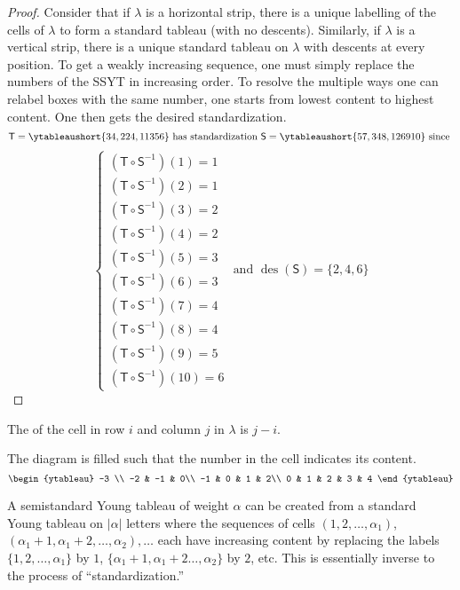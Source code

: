 \documentclass[11pt,leqno,oneside]{amsart}
\numberwithin{thm}{section}
\newcommand{\T}{\mathsf{T}} %
\renewcommand{\S}{\mathsf{S}}
\newcommand{\des}{\operatorname{des}}
\begin{document}
\begin{proof}
  Consider that if \(\lambda\) is a horizontal strip, there is a
  unique labelling of the cells of \(\lambda\) to form a standard
  tableau (with no descents). Similarly, if \(\lambda\) is a vertical
  strip, there is a unique standard tableau on \(\lambda\) with
  descents at every position. To get a weakly increasing sequence, one
  must simply replace the numbers of the SSYT in increasing order. To
  resolve the multiple ways one can relabel boxes with the same
  number, one starts from lowest content to highest content. One then
  gets the desired standardization.
\[
    \T = \ytableaushort{34,224,11356} \text{ has standardization }
    \S = \ytableaushort{57,348,1269{10}} \text{ since }
\]\[    \begin{cases}
      (\T \circ \S^{-1})(1) = 1\\
      (\T \circ \S^{-1})(2) = 1\\
      (\T \circ \S^{-1})(3) = 2\\
      (\T \circ \S^{-1})(4) = 2\\
      (\T \circ \S^{-1})(5) = 3\\
      (\T \circ \S^{-1})(6) = 3\\
      (\T \circ \S^{-1})(7) = 4\\
      (\T \circ \S^{-1})(8) = 4\\
      (\T \circ \S^{-1})(9) = 5\\
      (\T \circ \S^{-1})(10) = 6
    \end{cases}
    \text{ and } \des(\S) = \{2,4,6\}
  \]  
\end{proof}
\begin{defn}
  The  of the cell in row \(i\) and column \(j\) in
  \(\lambda\) is \(j-i\). 
\end{defn}
\begin{example}
  The diagram is filled such that the number in the cell indicates its
  content. \[
    \begin{ytableau}
      -3 \\
      -2 & -1 & 0\\
      -1 & 0 & 1 & 2\\
      0 & 1 & 2 & 3 & 4
    \end{ytableau}
  \]
\end{example}
\begin{rmk}
  A semistandard Young tableau of weight \(\alpha\) can be created from a
  standard 
  Young tableau on \(|\alpha|\) letters where the sequences of cells
  \((1,2,\ldots,\alpha_1)\), \((\alpha_1+1, \alpha_1+2, \ldots,
  \alpha_2), \ldots\) each have increasing content by replacing the labels
  \(\{1,2,\ldots,\alpha_1\}\) by \(1\), \(\{\alpha_1+1,
  \alpha_1+2\ldots, \alpha_2\}\) by \(2\), etc. This is essentially
  inverse to the process of ``standardization.''
\end{rmk}
\end{document}

